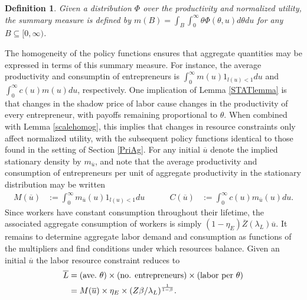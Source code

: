 \documentclass[11pt]{article}
\theoremstyle{plain}
\newtheorem{defn}{Definition}[section]
\begin{document}
\begin{defn}\label{summary_m}
Given a distribution $\Phi$ over the productivity and normalized utility, the summary measure is defined by $m(B) = \int_{B}\int_{0}^{\infty} \theta\Phi(\theta,u) d\theta du$ for any $B \subseteq [0, \infty)$.
\end{defn} 

The homogeneity of the policy functions ensures that aggregate quantities may be expressed in terms of this summary measure. For instance, the average productivity and consumptin of entrepreneurs is $\int_{0}^{\infty}m(u)1_{l(u)<1} du$ and $\int_{0}^{\infty}c(u)m(u) du$, respectively. One implication of Lemma \ref{STATlemma} is that changes in the shadow price of labor cause changes in the productivity of every entrepreneur, with payoffs remaining proportional to $\theta$. When combined with Lemma \ref{scalehomog}, this implies that changes in resource constraints only affect normalized utility, with the subsequent policy functions identical to those found in the setting of Section \ref{PriAg}. For any initial $\overline{u}$ denote the implied stationary density by $m_{\overline{u}}$, and note that the average productivity and consumption of entrepreneurs per unit of aggregate productivity in the stationary distribution may be written
\begin{equation}
\begin{aligned}
M(\overline{u}) & := \int_{0}^{\infty}m_{\overline{u}}(u)1_{l(u)<1}du \ \ \ \ \ & \ \ \ \ \
C(\overline{u}) & := \int_{0}^{\infty}c(u)m_{\overline{u}}(u)du.
\label{Output}
\end{aligned}
\end{equation} 
Since workers have constant consumption throughout their lifetime, the associated aggregate consumption of workers is simply $(1-\eta_E)\overline{Z}(\lambda_L)\overline{u}$. It remains to determine aggregate labor demand and consumption as functions of the multipliers and find conditions under which resources balance. Given an initial $\overline{u}$ the labor resource constraint reduces to
\begin{equation}
\begin{aligned}
\overline{L} & = (\textnormal{ave.} \ \theta) \times \textnormal{(no. entrepreneurs)} \times \textnormal{(labor per $\theta$)}
\\ & = M(\overline{u}) \times \eta_E \times {\left(Z\beta/\lambda_L\right)}^{\frac{1}{1-\beta}}.
\end{aligned}
\label{LRcons7}
\end{equation}
\end{document}

